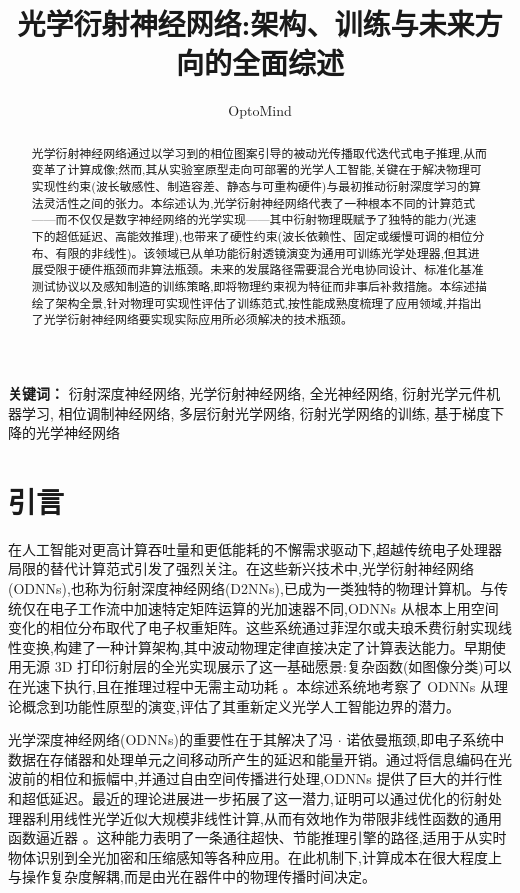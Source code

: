 \documentclass[11pt]{article}
\title{光学衍射神经网络:架构、训练与未来方向的全面综述}
\author{OptoMind}
\date{}
\begin{document}
\maketitle

\begin{abstract}
光学衍射神经网络通过以学习到的相位图案引导的被动光传播取代迭代式电子推理,从而变革了计算成像;然而,其从实验室原型走向可部署的光学人工智能,关键在于解决物理可实现性约束(波长敏感性、制造容差、静态与可重构硬件)与最初推动衍射深度学习的算法灵活性之间的张力。本综述认为,光学衍射神经网络代表了一种根本不同的计算范式------而不仅仅是数字神经网络的光学实现------其中衍射物理既赋予了独特的能力(光速下的超低延迟、高能效推理),也带来了硬性约束(波长依赖性、固定或缓慢可调的相位分布、有限的非线性)。该领域已从单功能衍射透镜演变为通用可训练光学处理器,但其进展受限于硬件瓶颈而非算法瓶颈。未来的发展路径需要混合光电协同设计、标准化基准测试协议以及感知制造的训练策略,即将物理约束视为特征而非事后补救措施。本综述描绘了架构全景,针对物理可实现性评估了训练范式,按性能成熟度梳理了应用领域,并指出了光学衍射神经网络要实现实际应用所必须解决的技术瓶颈。
\end{abstract}

\noindent\textbf{关键词：} 衍射深度神经网络, 光学衍射神经网络, 全光神经网络, 衍射光学元件机器学习, 相位调制神经网络, 多层衍射光学网络, 衍射光学网络的训练, 基于梯度下降的光学神经网络

\section{引言}\label{ux5f15ux8a00}

在人工智能对更高计算吞吐量和更低能耗的不懈需求驱动下,超越传统电子处理器局限的替代计算范式引发了强烈关注。在这些新兴技术中,光学衍射神经网络(ODNNs),也称为衍射深度神经网络(D2NNs),已成为一类独特的物理计算机。与传统仅在电子工作流中加速特定矩阵运算的光加速器不同,ODNNs 从根本上用空间变化的相位分布取代了电子权重矩阵。这些系统通过菲涅尔或夫琅禾费衍射实现线性变换,构建了一种计算架构,其中波动物理定律直接决定了计算表达能力。早期使用无源 3D 打印衍射层的全光实现展示了这一基础愿景:复杂函数(如图像分类)可以在光速下执行,且在推理过程中无需主动功耗 \citep{doi_10_1126_science_aat8084_e055772d}。本综述系统地考察了 ODNNs 从理论概念到功能性原型的演变,评估了其重新定义光学人工智能边界的潜力。

光学深度神经网络(ODNNs)的重要性在于其解决了冯 \(\cdot\) 诺依曼瓶颈,即电子系统中数据在存储器和处理单元之间移动所产生的延迟和能量开销。通过将信息编码在光波前的相位和振幅中,并通过自由空间传播进行处理,ODNNs 提供了巨大的并行性和超低延迟。最近的理论进展进一步拓展了这一潜力,证明可以通过优化的衍射处理器利用线性光学近似大规模非线性计算,从而有效地作为带限非线性函数的通用函数逼近器 \citep{doi_10_1186_s43593_025_00113_w_ca9e8e1e}。这种能力表明了一条通往超快、节能推理引擎的路径,适用于从实时物体识别到全光加密和压缩感知等各种应用。在此机制下,计算成本在很大程度上与操作复杂度解耦,而是由光在器件中的物理传播时间决定。
\end{document}
